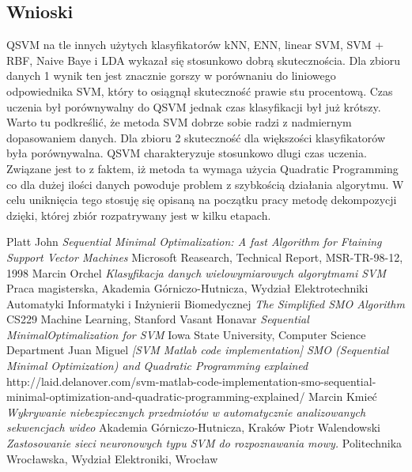 \documentclass[11pt]{article}
\begin{document}
\begin{enumerate}
 \subsection{Wnioski}
 QSVM na tle innych użytych klasyfikatorów kNN, ENN, linear SVM, SVM + RBF, Naive Baye i LDA wykazał się stosunkowo dobrą skutecznościa. Dla zbioru danych 1 wynik ten jest znacznie gorszy w porównaniu do liniowego odpowiednika SVM, który to osiągnął skuteczność prawie stu procentową. Czas uczenia był porównywalny do QSVM jednak czas klasyfikacji był już krótszy. Warto tu podkreślić, że metoda SVM dobrze sobie radzi z nadmiernym dopasowaniem danych. Dla zbioru 2 skuteczność dla większości klasyfikatorów była porównywalna. 
 \newline QSVM charakteryzuje stosunkowo dlugi czas uczenia. Związane jest to z faktem, iż metoda ta wymaga użycia Quadratic Programming co dla dużej ilości danych powoduje problem z szybkością działania algorytmu. W celu uniknięcia tego stosuję się opisaną na początku pracy metodę dekompozycji dzięki, której  zbiór rozpatrywany jest w kilku etapach. 
\newpage

\begin{thebibliography}{10}
	
	Platt John
	\textit{Sequential Minimal Optimalization: A fast Algorithm for Ftaining Support Vector Machines} 
	Microsoft Reasearch, Technical Report, MSR-TR-98-12, 1998
	Marcin Orchel
	\textit{Klasyfikacja danych wielowymiarowych algorytmami SVM} 
	Praca magisterska, Akademia Górniczo-Hutnicza, Wydział Elektrotechniki Automatyki Informatyki i Inżynierii Biomedycznej
	\textit{The Simplified SMO Algorithm} 
	 CS229 Machine Learning, Stanford
	Vasant Honavar 
	\textit{Sequential MinimalOptimalization for SVM} 
	Iowa State University, Computer Science Department 
	Juan Miguel 
	\textit{[SVM Matlab code implementation] SMO (Sequential Minimal Optimization) and Quadratic Programming explained} 
	http://laid.delanover.com/svm-matlab-code-implementation-smo-sequential-minimal-optimization-and-quadratic-programming-explained/
	Marcin Kmieć
	\textit{Wykrywanie niebezpiecznych przedmiotów w automatycznie
analizowanych sekwencjach wideo} 
	  Akademia Górniczo-Hutnicza, Kraków
	  Piotr Walendowski
	\textit{Zastosowanie sieci neuronowych typu SVM do
rozpoznawania mowy.} 
	  Politechnika Wrocławska, Wydział Elektroniki, Wrocław
\end{thebibliography}

\end{enumerate}
\end{document}
